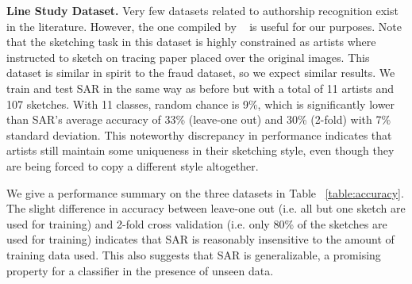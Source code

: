 



\noindent\textbf{Line Study Dataset.} Very few datasets related to authorship recognition exist in the literature. However, the one compiled by ~\cite{Cole:2008:PDL:1360612.1360687} is useful for our purposes. Note that the sketching task in this dataset is highly constrained as artists where instructed to sketch on tracing paper placed over the original images. This dataset is similar in spirit to the fraud dataset, so we expect similar results. We train and test SAR in the same way as before but with a total of 11 artists and 107 sketches. With 11 classes, random chance is 9\%, which is significantly lower than SAR's average accuracy of 33\% (leave-one out) and 30\% (2-fold) with 7\% standard deviation. This noteworthy discrepancy in performance indicates that artists still maintain some uniqueness in their sketching style, even though they are being forced to copy a different style altogether.

We give a performance summary on the three datasets in Table ~\ref{table:accuracy}. The slight difference in accuracy between leave-one out (i.e. all but one sketch are used for training) and 2-fold cross validation (i.e. only 80\% of the sketches are used for training) indicates that SAR is reasonably insensitive to the amount of training data used. This also suggests that SAR is generalizable, a promising property for a classifier in the presence of unseen data.

